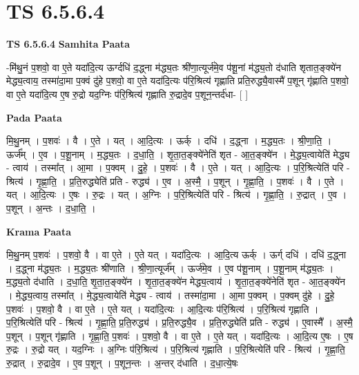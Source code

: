 \documentclass[17pt]{extarticle}
\begin{document}
\section{ TS 6.5.6.4 }

\textbf{TS 6.5.6.4 } \newline
\textbf{Samhita Paata} \newline

-मि॑थु॒नं प॒शवो॒ वा ए॒ते यदा॑दि॒त्य ऊर्ग्दधि॑ द॒द्ध्ना म॑द्ध्य॒तः श्री॑णा॒त्यूर्ज॑मे॒व प॑शू॒नां म॑द्ध्य॒तो द॑धाति शृतात॒ङ्क्ये॑न मेद्ध्य॒त्वाय॒ तस्मा॑दा॒मा प॒क्वं दु॑हे प॒शवो॒ वा ए॒ते यदा॑दि॒त्यः प॑रि॒श्रित्य॑ गृह्णाति प्रति॒रुद्ध्यै॒वास्मै॑ प॒शून् गृ॑ह्णाति प॒शवो॒ वा ए॒ते यदा॑दि॒त्य ए॒ष रु॒द्रो यद॒ग्निः प॑रि॒श्रित्य॑ गृह्णाति रु॒द्रादे॒व प॒शून॒न्तर्द॑धा- [  ] \newline

\textbf{Pada Paata} \newline

मि॒थु॒नम् । प॒शवः॑ । वै । ए॒ते । यत् । आ॒दि॒त्यः । ऊर्क् । दधि॑ । द॒द्ध्ना । म॒द्ध्य॒तः । श्री॒णा॒ति॒ । ऊर्ज᳚म् । ए॒व । प॒शू॒नाम् । म॒द्ध्य॒तः । द॒धा॒ति॒ । शृ॒ता॒त॒ङ्क्ये॑नेति॑ शृत - आ॒त॒ङ्क्ये॑न । मे॒द्ध्य॒त्वायेति॑ मेद्ध्य - त्वाय॑ । तस्मा᳚त् । आ॒मा । प॒क्वम् । दु॒हे॒ । प॒शवः॑ । वै । ए॒ते । यत् । आ॒दि॒त्यः । प॒रि॒श्रित्येति॑ परि - श्रित्य॑ । गृ॒ह्णा॒ति॒ । प्र॒ति॒रुद्ध्येति॑ प्रति - रुद्ध्य॑ । ए॒व । अ॒स्मै॒ । प॒शून् । गृ॒ह्णा॒ति॒ । प॒शवः॑ । वै । ए॒ते । यत् । आ॒दि॒त्यः । ए॒षः । रु॒द्रः । यत् । अ॒ग्निः । प॒रि॒श्रित्येति॑ परि - श्रित्य॑ । गृ॒ह्णा॒ति॒ । रु॒द्रात् । ए॒व । प॒शून् । अ॒न्तः । द॒धा॒ति॒ ।  \newline


\textbf{Krama Paata} \newline

मि॒थु॒नम् प॒शवः॑ । प॒शवो॒ वै । वा ए॒ते । ए॒ते यत् । यदा॑दि॒त्यः । आ॒दि॒त्य ऊर्क् । ऊर्ग् दधि॑ । दधि॑ द॒द्ध्ना । द॒द्ध्ना म॑द्ध्य॒तः । म॒द्ध्य॒तः श्री॑णाति । श्री॒णा॒त्यूर्ज᳚म् । ऊर्ज॑मे॒व । ए॒व प॑शू॒नाम् । प॒शू॒नाम् म॑द्ध्य॒तः । म॒द्ध्य॒तो द॑धाति । द॒धा॒ति॒ शृ॒ता॒त॒ङ्‍क्ये॑न । शृ॒ता॒त॒ङ्‍क्ये॑न मेद्ध्य॒त्वाय॑ । शृ॒ता॒त॒ङ्‍क्ये॑नेति॑ शृत - आ॒त॒ङ्‍क्ये॑न । मे॒द्ध्य॒त्वाय॒ तस्मा᳚त् । मे॒द्ध्य॒त्वायेति॑ मेद्ध्य - त्वाय॑ । तस्मा॑दा॒मा । आ॒मा प॒क्वम् । प॒क्वम् दु॑हे । दु॒हे॒ प॒शवः॑ । प॒शवो॒ वै । वा ए॒ते । ए॒ते यत् । यदा॑दि॒त्यः । आ॒दि॒त्यः प॑रि॒श्रित्य॑ । प॒रि॒श्रित्य॑ गृह्णाति । प॒रि॒श्रित्येति॑ परि - श्रित्य॑ । गृ॒ह्णा॒ति॒ प्र॒ति॒रुद्ध्य॑ । प्र॒ति॒रुद्ध्यै॒व । प्र॒ति॒रुद्ध्येति॑ प्रति - रुद्ध्य॑ । ए॒वास्मै᳚ । अ॒स्मै॒ प॒शून् । प॒शून् गृ॑ह्णाति । गृ॒ह्णा॒ति॒ प॒शवः॑ । प॒शवो॒ वै । वा ए॒ते । ए॒ते यत् । यदा॑दि॒त्यः । आ॒दि॒त्य ए॒षः । ए॒ष रु॒द्रः । रु॒द्रो यत् । यद॒ग्निः । अ॒ग्निः प॑रि॒श्रित्य॑ । प॒रि॒श्रित्य॑ गृह्णाति । प॒रि॒श्रित्येति॑ परि - श्रित्य॑ । गृ॒ह्णा॒ति॒ रु॒द्रात्  । रु॒द्रादे॒व । ए॒व प॒शून् । प॒शून॒न्तः । अ॒न्तर् द॑धाति । द॒धा॒त्ये॒षः \newline
\end{document}
